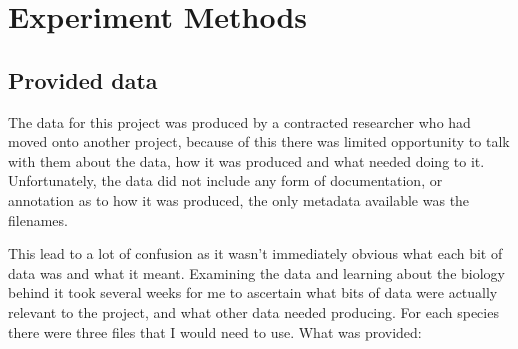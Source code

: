 \chapter{Experiment Methods}

% 
% 
% 
% 

\section{Provided data}
The data for this project was produced by a contracted researcher who had moved onto another project, because of this there was limited opportunity to talk with them about the data, how it was produced and what needed doing to it. Unfortunately, the data did not include any form of documentation, or annotation as to how it was produced, the only metadata available was the filenames. 

This lead to a lot of confusion as it wasn't immediately obvious what each bit of data was and what it meant. Examining the data and learning about the biology behind it took several weeks for me to ascertain what bits of data were actually relevant to the project, and what other data needed producing. For each species there were three files that I would need to use. What was provided:

